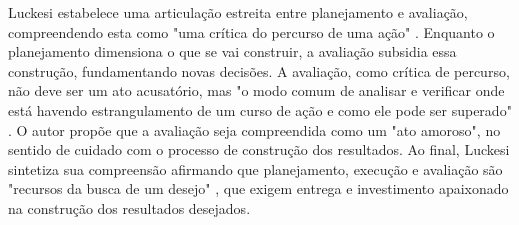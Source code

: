 Luckesi estabelece uma articulação estreita entre planejamento e avaliação, compreendendo esta como "uma crítica do percurso de uma ação" \cite{luckesi-avaprend}. Enquanto o planejamento dimensiona o que se vai construir, a avaliação subsidia essa construção, fundamentando novas decisões. A avaliação, como crítica de percurso, não deve ser um ato acusatório, mas "o modo comum de analisar e verificar onde está havendo estrangulamento de um curso de ação e como ele pode ser superado" \cite{luckesi-avaprend}. O autor propõe que a avaliação seja compreendida como um "ato amoroso", no sentido de cuidado com o processo de construção dos resultados. Ao final, Luckesi sintetiza sua compreensão afirmando que planejamento, execução e avaliação são "recursos da busca de um desejo" \cite{luckesi-avaprend}, que exigem entrega e investimento apaixonado na construção dos resultados desejados.

